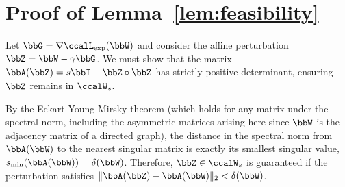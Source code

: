 \documentclass[conference]{IEEEtran}
\newcommand{\Lext}{\ccalL_{\mathrm{exp}}}
\begin{document}
    \section{Proof of Lemma~\ref{lem:feasibility}}
    \label{app:proof_lem_feasibility}
    \begin{IEEEproof}
		Let $\bbG = \nabla \Lext(\bbW)$ and consider the affine perturbation $\bbZ = \bbW - \gamma \bbG$. We must show that the matrix $\bbA(\bbZ) = s\bbI - \bbZ \circ \bbZ$ has strictly positive determinant, ensuring $\bbZ$ remains in $\ccalW_s$.
		
		By the Eckart-Young-Mirsky theorem (which holds for any matrix under the spectral norm, including the asymmetric matrices arising here since $\bbW$ is the adjacency matrix of a directed graph), the distance in the spectral norm from $\bbA(\bbW)$ to the nearest singular matrix is exactly its smallest singular value, $s_{\min}(\bbA(\bbW)) = \delta(\bbW)$. Therefore, $\bbZ \in \ccalW_s$ is guaranteed if the perturbation satisfies $\|\bbA(\bbZ) - \bbA(\bbW)\|_2 < \delta(\bbW)$.
		

\end{IEEEproof}
\end{document}
